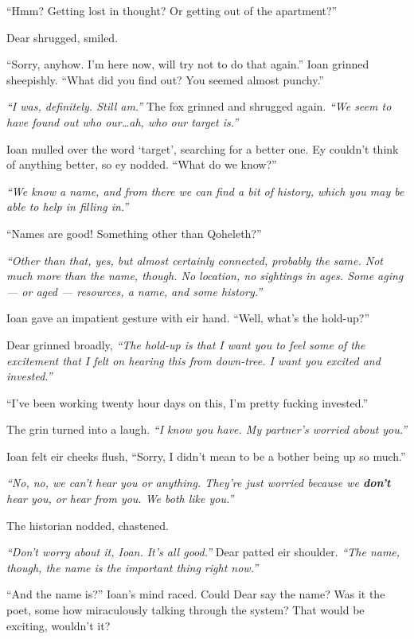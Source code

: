 ``Hmm? Getting lost in thought? Or getting out of the apartment?''

Dear shrugged, smiled.

``Sorry, anyhow. I'm here now, will try not to do that again.'' Ioan grinned sheepishly. ``What did you find out? You seemed almost punchy.''

\emph{``I was, definitely. Still am.''} The fox grinned and shrugged again. \emph{``We seem to have found out who our\ldots{}ah, who our target is.''}

Ioan mulled over the word `target', searching for a better one. Ey couldn't think of anything better, so ey nodded. ``What do we know?''

\emph{``We know a name, and from there we can find a bit of history, which you may be able to help in filling in.''}

``Names are good! Something other than Qoheleth?''

\emph{``Other than that, yes, but almost certainly connected, probably the same. Not much more than the name, though. No location, no sightings in ages. Some aging --- or aged --- resources, a name, and some history.''}

Ioan gave an impatient gesture with eir hand. ``Well, what's the hold-up?''

Dear grinned broadly, \emph{``The hold-up is that I want you to feel some of the excitement that I felt on hearing this from down-tree. I want you excited and invested.''}

``I've been working twenty hour days on this, I'm pretty fucking invested.''

The grin turned into a laugh. \emph{``I know you have. My partner's worried about you.''}

Ioan felt eir cheeks flush, ``Sorry, I didn't mean to be a bother being up so much.''

\emph{``No, no, we can't hear you or anything. They're just worried because we \textbf{don't} hear you, or hear from you. We both like you.''}

The historian nodded, chastened.

\emph{``Don't worry about it, Ioan. It's all good.''} Dear patted eir shoulder. \emph{``The name, though, the name is the important thing right now.''}

``And the name is?'' Ioan's mind raced. Could Dear say the name? Was it the poet, some how miraculously talking through the system? That would be exciting, wouldn't it?

